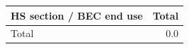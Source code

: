 \begin{tabular}{lr}
\toprule
HS section / BEC end use & Total \\
\midrule
\midrule
Total & 0.0 \\
\bottomrule
\end{tabular}
